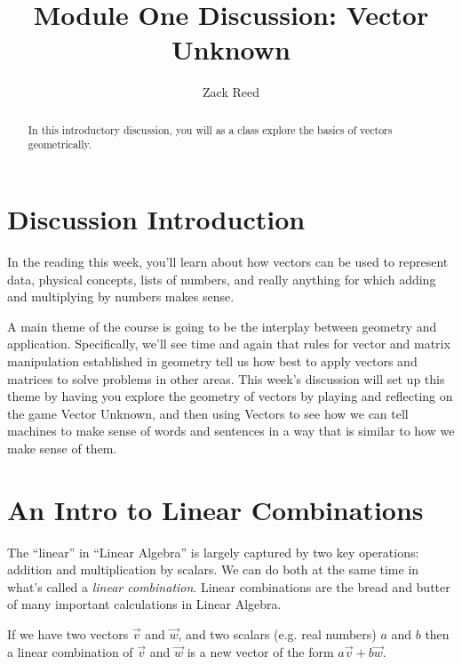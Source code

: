 \documentclass{ximera}
\author{Zack Reed}
\title{Module One Discussion: Vector Unknown}
\begin{document}
\begin{abstract}

    In this introductory discussion, you will as a class explore the basics of vectors geometrically.

\end{abstract}
\maketitle


\section{Discussion Introduction}

  In the reading this week, you'll learn about how vectors can be used to represent data, physical concepts, lists of numbers, and really anything for which adding and multiplying by numbers makes sense. 
  
  A main theme of the course is going to be the interplay between geometry and application. Specifically, we'll see time and again that rules for vector and matrix manipulation established in geometry tell us how best to apply vectors and matrices to solve problems in other areas. This week's discussion will set up this theme by having you explore the geometry of vectors by playing and reflecting on the game Vector Unknown, and then using Vectors to see how we can tell machines to make sense of words and sentences in a way that is similar to how we make sense of them.

\section{An Intro to Linear Combinations}

  The ``linear'' in  ``Linear Algebra'' is largely captured by two key operations: addition and multiplication by scalars. We can do both at the same time in what's called a \emph{linear combination}. Linear combinations are the bread and butter of many important calculations in Linear Algebra. 

  If we have two vectors $\vec{v}$ and $\vec{w}$, and two scalars (e.g. real numbers) $a$ and $b$ then a linear combination of $\vec{v}$ and $\vec{w}$ is a new vector of the form $a\vec{v} + b\vec{w}$.
\end{document}
